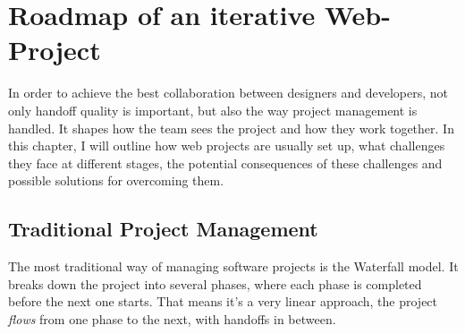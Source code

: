 \newpage
\section{Roadmap of an iterative Web-Project}
In order to achieve the best collaboration between designers and developers, not only handoff
quality is important, but also the way project management is handled. It shapes how the team sees
the project and how they work together. In this chapter, I will outline how web projects are usually
set up, what challenges they face at different stages, the potential consequences of these
challenges and possible solutions for overcoming them.

\subsection{Traditional Project Management}
The most traditional way of managing software projects is the Waterfall model. It breaks down the
project into several phases, where each phase is completed before the next one starts. That means
it's a very linear approach, the project \textit{flows} from one phase to the next, with handoffs in
between. 

